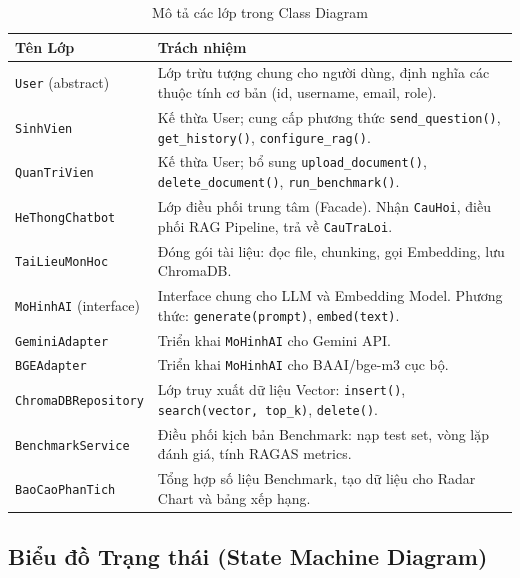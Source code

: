 \begin{table}[H]
  \centering
  \caption{Mô tả các lớp trong Class Diagram}
  \label{tab:classes}
  \renewcommand{\arraystretch}{1.4}
  \begin{tabularx}{\textwidth}{|l|X|}
    \hline
    \rowcolor{blue!10}
    \textbf{Tên Lớp} & \textbf{Trách nhiệm} \\
    \hline
    \texttt{User} (abstract) & Lớp trừu tượng chung cho người dùng, định nghĩa các thuộc tính cơ bản (id, username, email, role). \\
    \hline
    \texttt{SinhVien} & Kế thừa User; cung cấp phương thức \texttt{send\_question()}, \texttt{get\_history()}, \texttt{configure\_rag()}. \\
    \hline
    \texttt{QuanTriVien} & Kế thừa User; bổ sung \texttt{upload\_document()}, \texttt{delete\_document()}, \texttt{run\_benchmark()}. \\
    \hline
    \texttt{HeThongChatbot} & Lớp điều phối trung tâm (Facade). Nhận \texttt{CauHoi}, điều phối RAG Pipeline, trả về \texttt{CauTraLoi}. \\
    \hline
    \texttt{TaiLieuMonHoc} & Đóng gói tài liệu: đọc file, chunking, gọi Embedding, lưu ChromaDB. \\
    \hline
    \texttt{MoHinhAI} (interface) & Interface chung cho LLM và Embedding Model. Phương thức: \texttt{generate(prompt)}, \texttt{embed(text)}. \\
    \hline
    \texttt{GeminiAdapter} & Triển khai \texttt{MoHinhAI} cho Gemini API. \\
    \hline
    \texttt{BGEAdapter} & Triển khai \texttt{MoHinhAI} cho BAAI/bge-m3 cục bộ. \\
    \hline
    \texttt{ChromaDBRepository} & Lớp truy xuất dữ liệu Vector: \texttt{insert()}, \texttt{search(vector, top\_k)}, \texttt{delete()}. \\
    \hline
    \texttt{BenchmarkService} & Điều phối kịch bản Benchmark: nạp test set, vòng lặp đánh giá, tính RAGAS metrics. \\
    \hline
    \texttt{BaoCaoPhanTich} & Tổng hợp số liệu Benchmark, tạo dữ liệu cho Radar Chart và bảng xếp hạng. \\
    \hline
  \end{tabularx}
\end{table}

\subsection{Biểu đồ Trạng thái (State Machine Diagram)}

